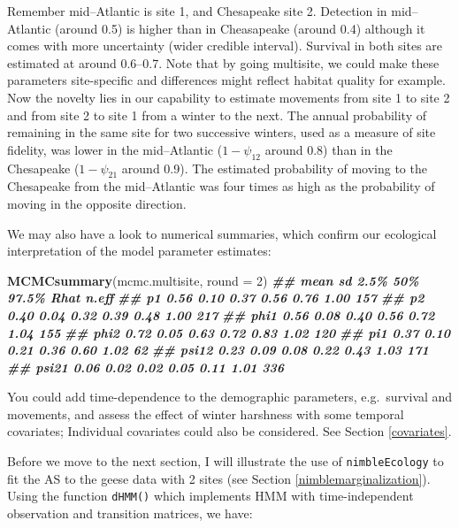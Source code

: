 \documentclass[
  12pt,
]{krantz}
\newenvironment{Shaded}{\begin{snugshade}}{\end{snugshade}}
\newcommand{\AttributeTok}[1]{\textcolor[rgb]{0.13,0.29,0.53}{#1}}
\newcommand{\DecValTok}[1]{\textcolor[rgb]{0.00,0.00,0.81}{#1}}
\newcommand{\DocumentationTok}[1]{\textcolor[rgb]{0.56,0.35,0.01}{\textbf{\textit{#1}}}}
\newcommand{\FunctionTok}[1]{\textcolor[rgb]{0.13,0.29,0.53}{\textbf{#1}}}
\newcommand{\NormalTok}[1]{#1}
\begin{document}
Remember mid--Atlantic is site 1, and Chesapeake site 2. Detection in mid--Atlantic (around 0.5) is higher than in Cheasapeake (around 0.4) although it comes with more uncertainty (wider credible interval). Survival in both sites are estimated at around 0.6--0.7. Note that by going multisite, we could make these parameters site-specific and differences might reflect habitat quality for example. Now the novelty lies in our capability to estimate movements from site 1 to site 2 and from site 2 to site 1 from a winter to the next. The annual probability of remaining in the same site for two successive winters, used as a measure of site fidelity, was lower in the mid--Atlantic (\(1-\psi_{12}\) around 0.8) than in the Chesapeake (\(1-\psi_{21}\) around 0.9). The estimated probability of moving to the Chesapeake from the mid--Atlantic was four times as high as the probability of moving in the opposite direction.

We may also have a look to numerical summaries, which confirm our ecological interpretation of the model parameter estimates:

\begin{Shaded}
\begin{Highlighting}[]
\FunctionTok{MCMCsummary}\NormalTok{(mcmc.multisite, }\AttributeTok{round =} \DecValTok{2}\NormalTok{)}
\DocumentationTok{\#\#       mean   sd 2.5\%  50\% 97.5\% Rhat n.eff}
\DocumentationTok{\#\# p1    0.56 0.10 0.37 0.56  0.76 1.00   157}
\DocumentationTok{\#\# p2    0.40 0.04 0.32 0.39  0.48 1.00   217}
\DocumentationTok{\#\# phi1  0.56 0.08 0.40 0.56  0.72 1.04   155}
\DocumentationTok{\#\# phi2  0.72 0.05 0.63 0.72  0.83 1.02   120}
\DocumentationTok{\#\# pi1   0.37 0.10 0.21 0.36  0.60 1.02    62}
\DocumentationTok{\#\# psi12 0.23 0.09 0.08 0.22  0.43 1.03   171}
\DocumentationTok{\#\# psi21 0.06 0.02 0.02 0.05  0.11 1.01   336}
\end{Highlighting}
\end{Shaded}

You could add time-dependence to the demographic parameters, e.g.~survival and movements, and assess the effect of winter harshness with some temporal covariates; Individual covariates could also be considered. See Section \ref{covariates}.

Before we move to the next section, I will illustrate the use of \texttt{nimbleEcology} to fit the AS to the geese data with 2 sites (see Section \ref{nimblemarginalization}). Using the function \texttt{dHMM()} which implements HMM with time-independent observation and transition matrices, we have:
\end{document}
